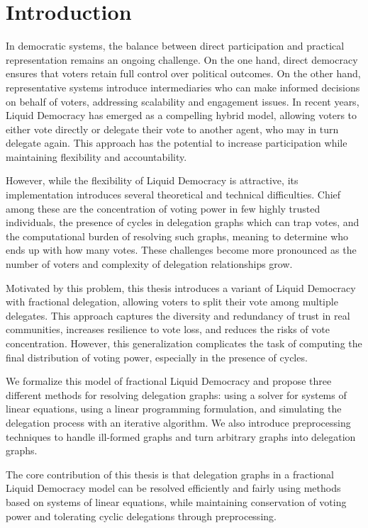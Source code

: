 
\chapter{Introduction}

In democratic systems, the balance between direct participation and practical representation remains an ongoing challenge. On the one hand, direct democracy ensures that voters retain full control over political outcomes. On the other hand, representative systems introduce intermediaries who can make informed decisions on behalf of voters, addressing scalability and engagement issues. In recent years, Liquid Democracy has emerged as a compelling hybrid model, allowing voters to either vote directly or delegate their vote to another agent, who may in turn delegate again. This approach has the potential to increase participation while maintaining flexibility and accountability.

However, while the flexibility of Liquid Democracy is attractive, its implementation introduces several theoretical and technical difficulties. Chief among these are the concentration of voting power in few highly trusted individuals, the presence of cycles in delegation graphs which can trap votes, and the computational burden of resolving such graphs, meaning to determine who ends up with how many votes. These challenges become more pronounced as the number of voters and complexity of delegation relationships grow.

Motivated by this problem, this thesis introduces a variant of Liquid Democracy with fractional delegation, allowing voters to split their vote among multiple delegates. This approach captures the diversity and redundancy of trust in real communities, increases resilience to vote loss, and reduces the risks of vote concentration. However, this generalization complicates the task of computing the final distribution of voting power, especially in the presence of cycles.

We formalize this model of fractional Liquid Democracy and propose three different methods for resolving delegation graphs: using a solver for systems of linear equations, using a linear programming formulation, and simulating the delegation process with an iterative algorithm. We also introduce preprocessing techniques to handle ill-formed graphs and turn arbitrary graphs into delegation graphs.

The core contribution of this thesis is that delegation graphs in a fractional Liquid Democracy model can be resolved efficiently and fairly using methods based on systems of linear equations, while maintaining conservation of voting power and tolerating cyclic delegations through preprocessing.

